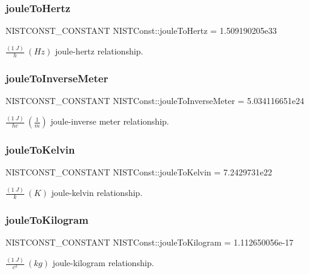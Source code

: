 \subsubsection{\texorpdfstring{joule\+To\+Hertz}{jouleToHertz}}
{\footnotesize\ttfamily N\+I\+S\+T\+C\+O\+N\+S\+T\+\_\+\+C\+O\+N\+S\+T\+A\+NT N\+I\+S\+T\+Const\+::joule\+To\+Hertz = 1.\+509190205e33}

$\frac{(1\ J)}{h} \ (Hz)$ joule-\/hertz relationship. \mbox{\label{group___n_i_s_t_const-_joule_gaf31dbc48b766c4fe5d70ddb485253be8}} 
\subsubsection{\texorpdfstring{joule\+To\+Inverse\+Meter}{jouleToInverseMeter}}
{\footnotesize\ttfamily N\+I\+S\+T\+C\+O\+N\+S\+T\+\_\+\+C\+O\+N\+S\+T\+A\+NT N\+I\+S\+T\+Const\+::joule\+To\+Inverse\+Meter = 5.\+034116651e24}

$\frac{(1\ J)}{hc} \ (\frac{1}{m})$ joule-\/inverse meter relationship. \mbox{\label{group___n_i_s_t_const-_joule_gabba35f3a458ac8488e06a1ec82b98a06}} 
\subsubsection{\texorpdfstring{joule\+To\+Kelvin}{jouleToKelvin}}
{\footnotesize\ttfamily N\+I\+S\+T\+C\+O\+N\+S\+T\+\_\+\+C\+O\+N\+S\+T\+A\+NT N\+I\+S\+T\+Const\+::joule\+To\+Kelvin = 7.\+2429731e22}

$\frac{(1\ J)}{k} \ (K)$ joule-\/kelvin relationship. \mbox{\label{group___n_i_s_t_const-_joule_ga94f11f25f1efe95fef2594b97366c81e}} 
\subsubsection{\texorpdfstring{joule\+To\+Kilogram}{jouleToKilogram}}
{\footnotesize\ttfamily N\+I\+S\+T\+C\+O\+N\+S\+T\+\_\+\+C\+O\+N\+S\+T\+A\+NT N\+I\+S\+T\+Const\+::joule\+To\+Kilogram = 1.\+112650056e-\/17}

$\frac{(1\ J)}{c^2} \ (kg)$ joule-\/kilogram relationship. 